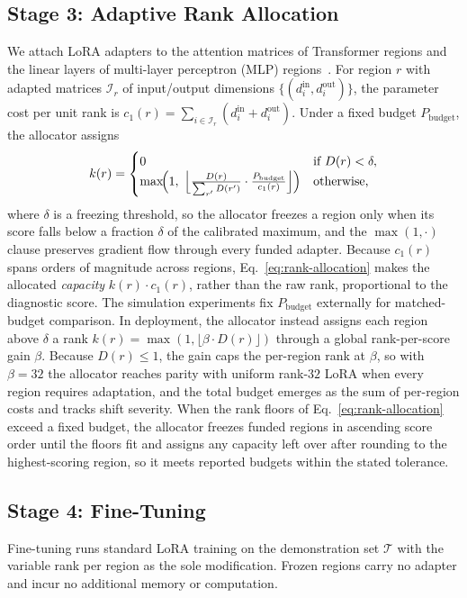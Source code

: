 \subsection{Stage 3: Adaptive Rank Allocation}
\label{sec:method-allocate}

We attach LoRA adapters to the attention matrices of Transformer regions and the linear layers of multi-layer perceptron (MLP) regions~\cite{Hu2022LoRA}.
For region $r$ with adapted matrices $\mathcal{I}_r$ of input/output dimensions $\{(d^{\text{in}}_i, d^{\text{out}}_i)\}$, the parameter cost per unit rank is $c_1(r) = \sum_{i \in \mathcal{I}_r} (d^{\text{in}}_i + d^{\text{out}}_i)$.
Under a fixed budget $P_\text{budget}$, the allocator assigns
%
\begin{equation}
\label{eq:rank-allocation}
    k(r) =
    \begin{cases}
        0 & \text{if } D(r) < \delta, \\
        \max\!\Bigl(1,\;
            \Bigl\lfloor
                \frac{D(r)}{\sum_{r'} D(r')}
                \cdot \frac{P_\text{budget}}{c_1(r)}
            \Bigr\rfloor
        \Bigr) & \text{otherwise,}
    \end{cases}
\end{equation}
%
where $\delta$ is a freezing threshold, so the allocator freezes a region only when its score falls below a fraction $\delta$ of the calibrated maximum, and the $\max(1, \cdot)$ clause preserves gradient flow through every funded adapter.
Because $c_1(r)$ spans orders of magnitude across regions, Eq.~\ref{eq:rank-allocation} makes the allocated \emph{capacity} $k(r) \cdot c_1(r)$, rather than the raw rank, proportional to the diagnostic score.
The simulation experiments fix $P_\text{budget}$ externally for matched-budget comparison.
In deployment, the allocator instead assigns each region above $\delta$ a rank $k(r) = \max(1, \lfloor \beta \cdot D(r) \rfloor)$ through a global rank-per-score gain $\beta$.
Because $D(r) \leq 1$, the gain caps the per-region rank at $\beta$, so with $\beta = 32$ the allocator reaches parity with uniform rank-$32$ LoRA when every region requires adaptation, and the total budget emerges as the sum of per-region costs and tracks shift severity.
When the rank floors of Eq.~\ref{eq:rank-allocation} exceed a fixed budget, the allocator freezes funded regions in ascending score order until the floors fit and assigns any capacity left over after rounding to the highest-scoring region, so it meets reported budgets within the stated tolerance.

\subsection{Stage 4: Fine-Tuning}
\label{sec:method-adapt}

Fine-tuning runs standard LoRA training on the demonstration set $\mathcal{T}$ with the variable rank per region as the sole modification.
Frozen regions carry no adapter and incur no additional memory or computation.